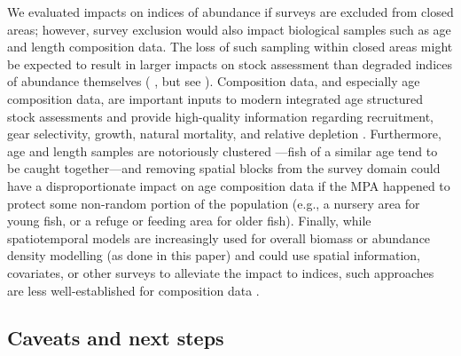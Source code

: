 \documentclass[12pt]{article}
\begin{document}
We evaluated impacts on indices of abundance if surveys are excluded from closed areas; however, survey exclusion would also impact biological samples such as age and length composition data.
The loss of such sampling within closed areas might be expected to result in larger impacts on stock assessment than degraded indices of abundance themselves (\citeauthor{yin2004} \citeyear{yin2004}, but see \citeauthor{chen2003} \citeyear{chen2003}).
Composition data, and especially age composition data, are important inputs to modern integrated age structured stock assessments and provide high-quality information regarding recruitment, gear selectivity, growth, natural mortality, and relative depletion \citep{magnusson2007, ono2015}.
Furthermore, age and length samples are notoriously clustered \citep{hilbornwalters1992, francis2011}---fish of a similar age tend to be caught together---and removing spatial blocks from the survey domain could have a disproportionate impact on age composition data if the MPA happened to protect some non-random portion of the population (e.g., a nursery area for young fish, or a refuge or feeding area for older fish).
Finally, while spatiotemporal models are increasingly used for overall biomass or abundance density modelling (as done in this paper) and could use spatial information, covariates, or other surveys to alleviate the impact to indices, such approaches are less well-established for composition data \citep[but see][]{thorsonhaltuch2018}.

\subsection*{Caveats and next steps}
\end{document}
